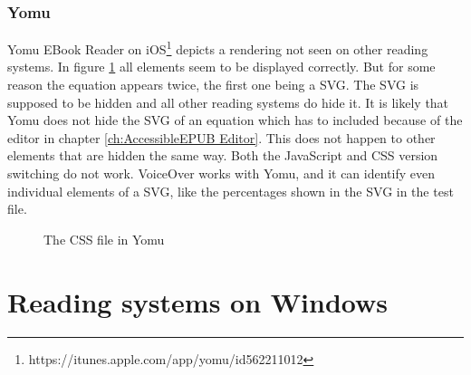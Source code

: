 \subsubsection{Yomu}
Yomu EBook Reader on iOS\footnote{https://itunes.apple.com/app/yomu/id562211012} depicts a rendering not seen on other reading systems. In figure \ref{fig:yomu} all elements seem to be displayed correctly. But for some reason the equation appears twice, the first one being a SVG. The SVG is supposed to be hidden and all other reading systems do hide it. It is likely that Yomu does not hide the SVG of an equation which has to included because of the editor in chapter \ref{ch:AccessibleEPUB Editor}. This does not happen to other elements that are hidden the same way. Both the JavaScript and CSS version switching do not work. VoiceOver works with Yomu, and it can identify even individual elements of a SVG, like the percentages shown in the SVG in the test file.
\begin{figure}[H]
	\centering
	\caption{The CSS file in Yomu}
	\label{fig:yomu}
\end{figure}

\section{Reading systems on Windows}

